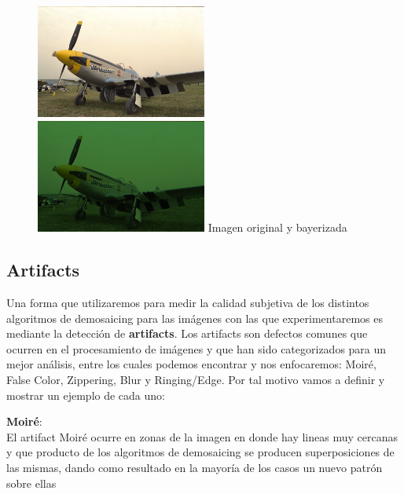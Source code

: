 \begin{figure}[h]
       \includegraphics[width=0.5\textwidth]{imagenes/img9.png}
           \hfill
        \includegraphics[width=0.5\textwidth]{imagenes/img9_bayer.png}   
        Imagen original y bayerizada
\end{figure}
\newpage
\subsection{Artifacts}

Una forma que utilizaremos para medir la calidad subjetiva de los distintos algoritmos de demosaicing para las imágenes con las que experimentaremos es mediante la detección de \textbf{artifacts}. Los artifacts son defectos comunes que ocurren en el procesamiento de imágenes y que han sido categorizados para un mejor análisis, entre los cuales podemos encontrar y nos enfocaremos: Moiré, False Color, Zippering, Blur y Ringing/Edge. Por tal motivo vamos a definir y mostrar un ejemplo de cada uno:

\textbf{Moiré}:\\
El artifact Moiré ocurre en zonas de la imagen en donde hay lineas muy cercanas y que producto de los algoritmos de demosaicing se producen superposiciones de las mismas, dando como resultado en la mayoría de los casos un nuevo patrón sobre ellas\\

